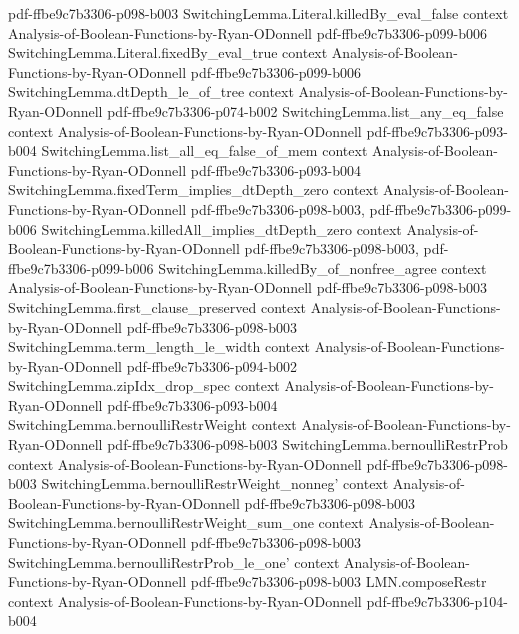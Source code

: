 \begin{lemma}
  {pdf-ffbe9c7b3306-p098-b003}
\proofstep
  {SwitchingLemma.Literal.killedBy_eval_false}
  {context}
  {Analysis-of-Boolean-Functions-by-Ryan-ODonnell}
  {pdf-ffbe9c7b3306-p099-b006}
\proofstep
  {SwitchingLemma.Literal.fixedBy_eval_true}
  {context}
  {Analysis-of-Boolean-Functions-by-Ryan-ODonnell}
  {pdf-ffbe9c7b3306-p099-b006}
\proofstep
  {SwitchingLemma.dtDepth_le_of_tree}
  {context}
  {Analysis-of-Boolean-Functions-by-Ryan-ODonnell}
  {pdf-ffbe9c7b3306-p074-b002}
\proofstep
  {SwitchingLemma.list_any_eq_false}
  {context}
  {Analysis-of-Boolean-Functions-by-Ryan-ODonnell}
  {pdf-ffbe9c7b3306-p093-b004}
\proofstep
  {SwitchingLemma.list_all_eq_false_of_mem}
  {context}
  {Analysis-of-Boolean-Functions-by-Ryan-ODonnell}
  {pdf-ffbe9c7b3306-p093-b004}
\proofstep
  {SwitchingLemma.fixedTerm_implies_dtDepth_zero}
  {context}
  {Analysis-of-Boolean-Functions-by-Ryan-ODonnell}
  {pdf-ffbe9c7b3306-p098-b003,
    pdf-ffbe9c7b3306-p099-b006}
\proofstep
  {SwitchingLemma.killedAll_implies_dtDepth_zero}
  {context}
  {Analysis-of-Boolean-Functions-by-Ryan-ODonnell}
  {pdf-ffbe9c7b3306-p098-b003,
    pdf-ffbe9c7b3306-p099-b006}
\proofstep
  {SwitchingLemma.killedBy_of_nonfree_agree}
  {context}
  {Analysis-of-Boolean-Functions-by-Ryan-ODonnell}
  {pdf-ffbe9c7b3306-p098-b003}
\proofstep
  {SwitchingLemma.first_clause_preserved}
  {context}
  {Analysis-of-Boolean-Functions-by-Ryan-ODonnell}
  {pdf-ffbe9c7b3306-p098-b003}
\proofstep
  {SwitchingLemma.term_length_le_width}
  {context}
  {Analysis-of-Boolean-Functions-by-Ryan-ODonnell}
  {pdf-ffbe9c7b3306-p094-b002}
\proofstep
  {SwitchingLemma.zipIdx_drop_spec}
  {context}
  {Analysis-of-Boolean-Functions-by-Ryan-ODonnell}
  {pdf-ffbe9c7b3306-p093-b004}
\proofstep
  {SwitchingLemma.bernoulliRestrWeight}
  {context}
  {Analysis-of-Boolean-Functions-by-Ryan-ODonnell}
  {pdf-ffbe9c7b3306-p098-b003}
\proofstep
  {SwitchingLemma.bernoulliRestrProb}
  {context}
  {Analysis-of-Boolean-Functions-by-Ryan-ODonnell}
  {pdf-ffbe9c7b3306-p098-b003}
\proofstep
  {SwitchingLemma.bernoulliRestrWeight_nonneg'}
  {context}
  {Analysis-of-Boolean-Functions-by-Ryan-ODonnell}
  {pdf-ffbe9c7b3306-p098-b003}
\proofstep
  {SwitchingLemma.bernoulliRestrWeight_sum_one}
  {context}
  {Analysis-of-Boolean-Functions-by-Ryan-ODonnell}
  {pdf-ffbe9c7b3306-p098-b003}
\proofstep
  {SwitchingLemma.bernoulliRestrProb_le_one'}
  {context}
  {Analysis-of-Boolean-Functions-by-Ryan-ODonnell}
  {pdf-ffbe9c7b3306-p098-b003}
\proofstep
  {LMN.composeRestr}
  {context}
  {Analysis-of-Boolean-Functions-by-Ryan-ODonnell}
  {pdf-ffbe9c7b3306-p104-b004}
\proofstep

\end{lemma}
